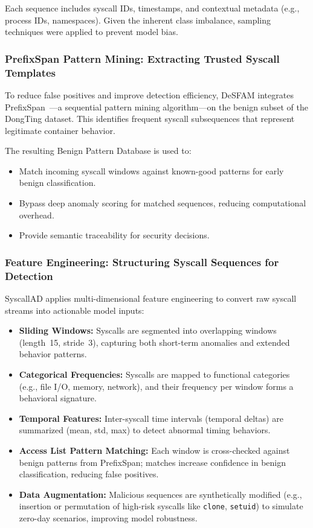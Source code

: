 Each sequence includes syscall IDs, timestamps, and contextual metadata (e.g., process IDs,
namespaces). Given the inherent class imbalance, sampling techniques were applied to prevent
model bias.

\subsubsection{PrefixSpan Pattern Mining: Extracting Trusted Syscall Templates}
\label{subsubsec:prefixspan}

To reduce false positives and improve detection efficiency, DeSFAM integrates
PrefixSpan~\cite{prefixspan_pei}---a sequential pattern mining algorithm---on the benign subset
of the DongTing dataset. This identifies frequent syscall subsequences that represent legitimate
container behavior.

The resulting Benign Pattern Database is used to:
\begin{itemize}
  \item Match incoming syscall windows against known-good patterns for early benign
        classification.
  \item Bypass deep anomaly scoring for matched sequences, reducing computational overhead.
  \item Provide semantic traceability for security decisions.
\end{itemize}

\subsubsection{Feature Engineering: Structuring Syscall Sequences for Detection}
\label{subsubsec:features}

SyscallAD applies multi-dimensional feature engineering to convert raw syscall streams into
actionable model inputs:

\begin{itemize}
  \item \textbf{Sliding Windows:} Syscalls are segmented into overlapping windows (length~15,
        stride~3), capturing both short-term anomalies and extended behavior patterns.
  \item \textbf{Categorical Frequencies:} Syscalls are mapped to functional categories (e.g.,
        file I/O, memory, network), and their frequency per window forms a behavioral signature.
  \item \textbf{Temporal Features:} Inter-syscall time intervals (temporal deltas) are
        summarized (mean, std, max) to detect abnormal timing behaviors.
  \item \textbf{Access List Pattern Matching:} Each window is cross-checked against benign
        patterns from PrefixSpan; matches increase confidence in benign classification, reducing
        false positives.
  \item \textbf{Data Augmentation:} Malicious sequences are synthetically modified (e.g.,
        insertion or permutation of high-risk syscalls like \texttt{clone}, \texttt{setuid}) to
        simulate zero-day scenarios, improving model robustness.
\end{itemize}

